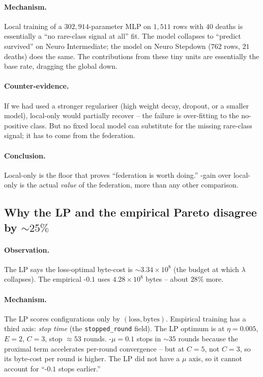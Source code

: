 \paragraph{Mechanism.} Local training of a $302{,}914$-parameter MLP on $1{,}511$
rows with $40$ deaths is essentially a ``no rare-class signal at all'' fit.
The model collapses to ``predict survived'' on Neuro Intermediate; the model
on Neuro Stepdown ($762$ rows, $21$ deaths) does the same. The \auprc{}
contributions from these tiny units are essentially the base rate, dragging
the global \auprc{} down.

\paragraph{Counter-evidence.} If we had used a stronger regulariser (high
weight decay, dropout, or a smaller model), local-only would partially
recover -- the failure is over-fitting to the no-positive class. But no fixed
local model can substitute for the missing rare-class signal; it has to come
from the federation.

\paragraph{Conclusion.} Local-only is the floor that proves ``federation is
worth doing.'' \auprc{}-gain over local-only is the actual \emph{value} of
the federation, more than any other comparison.

\subsection{Why the LP and the empirical Pareto disagree by $\sim 25\%$}
\label{sec:mechanism-pareto-vs-lp}

\paragraph{Observation.} The LP says the loss-optimal byte-cost is
$\sim 3.34 \!\times\! 10^8$ (the budget at which $\lambda$ collapses). The
empirical \fedprox{}-$0.1$ uses $4.28 \!\times\! 10^8$ bytes -- about $28\%$
more.

\paragraph{Mechanism.} The LP scores configurations only by $(\mathrm{loss},
\mathrm{bytes})$. Empirical training has a third axis: \emph{stop time} (the
\texttt{stopped\_round} field). The LP optimum is at $\eta\!=\!0.005$, $E\!=\!2$,
$C\!=\!3$, stop $\approx 53$ rounds. \fedprox{}-$\mu\!=\!0.1$ stops in
$\sim$$35$ rounds because the proximal term accelerates per-round
convergence -- but at $C\!=\!5$, not $C\!=\!3$, so its byte-cost per round is
higher. The LP did not have a $\mu$ axis, so it cannot account for
``\fedprox{}-$0.1$ stops earlier.''

